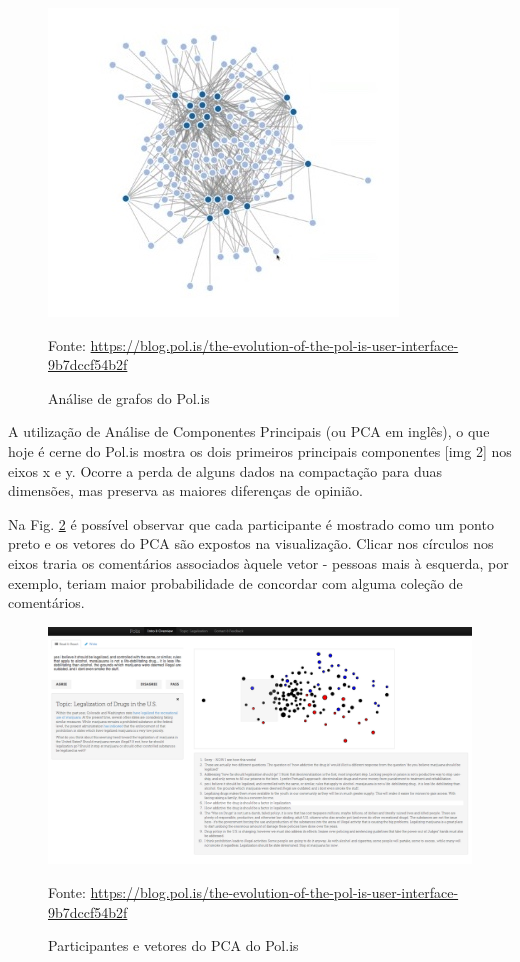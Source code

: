 \begin{figure}[h]
	\centering
	\includegraphics[keepaspectratio=true,scale=0.4]{figuras/evolucao-polis-1.png}
	\caption{Análise de grafos do Pol.is}
	Fonte: \url{https://blog.pol.is/the-evolution-of-the-pol-is-user-interface-9b7dccf54b2f}
	\label{fig01}
\end{figure}

A utilização de Análise de Componentes Principais (ou PCA em inglês), o que hoje é cerne do Pol.is mostra os dois primeiros principais componentes [img 2] nos eixos x e y. Ocorre a perda de alguns dados na compactação para duas dimensões, mas preserva as maiores diferenças de opinião. 

Na Fig. \ref{fig02} é possível observar que cada participante é mostrado como um ponto preto e os vetores do PCA são expostos na visualização. Clicar nos círculos nos eixos traria os comentários associados àquele vetor - pessoas mais à esquerda, por exemplo, teriam maior probabilidade de concordar com alguma coleção de comentários.


\begin{figure}[h]
	\centering
	\includegraphics[keepaspectratio=true,scale=0.2]{figuras/evolucao-polis-2.png}
	\caption{Participantes e vetores do PCA do Pol.is}
	Fonte: \url{https://blog.pol.is/the-evolution-of-the-pol-is-user-interface-9b7dccf54b2f}
	\label{fig02}
\end{figure}


